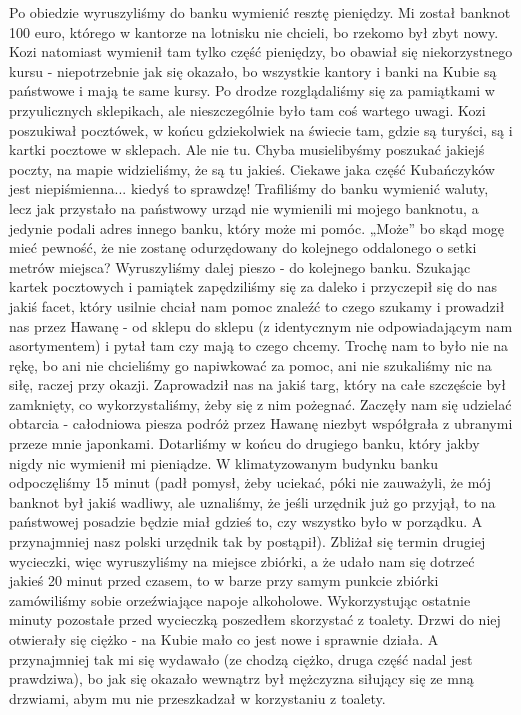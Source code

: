 Po obiedzie wyruszyliśmy do banku wymienić resztę pieniędzy. Mi został banknot 100 euro, którego w kantorze na lotnisku nie chcieli, bo rzekomo był zbyt nowy. Kozi natomiast wymienił tam tylko część pieniędzy, bo obawiał się niekorzystnego kursu - niepotrzebnie jak się okazało, bo wszystkie kantory i banki na Kubie są państwowe i mają te same kursy.
Po drodze rozglądaliśmy się za pamiątkami w przyulicznych sklepikach, ale nieszczególnie było tam coś wartego uwagi.
Kozi poszukiwał pocztówek, w końcu gdziekolwiek na świecie tam, gdzie są turyści, są i kartki pocztowe w sklepach.
Ale nie tu.
Chyba musielibyśmy poszukać jakiejś poczty, na mapie widzieliśmy, że są tu jakieś.
Ciekawe jaka część Kubańczyków jest niepiśmienna...
kiedyś to sprawdzę!
Trafiliśmy do banku wymienić waluty, lecz jak przystało na państwowy urząd nie wymienili mi mojego banknotu, a jedynie podali adres innego banku, który może mi pomóc.
„Może” bo skąd mogę mieć pewność, że nie zostanę odurzędowany do kolejnego oddalonego o setki metrów miejsca?
Wyruszyliśmy dalej pieszo - do kolejnego banku.
Szukając kartek pocztowych i pamiątek zapędziliśmy się za daleko i przyczepił się do nas jakiś facet, który usilnie chciał nam pomoc znaleźć to czego szukamy i prowadził nas przez Hawanę - od sklepu do sklepu (z identycznym nie odpowiadającym nam asortymentem) i pytał tam czy mają to czego chcemy.
Trochę nam to było nie na rękę, bo ani nie chcieliśmy go napiwkować za pomoc, ani nie szukaliśmy nic na siłę, raczej przy okazji.
Zaprowadził nas na jakiś targ, który na całe szczęście był zamknięty, co wykorzystaliśmy, żeby się z nim pożegnać.
Zaczęły nam się udzielać obtarcia - całodniowa piesza podróż przez Hawanę niezbyt współgrała z ubranymi przeze mnie japonkami.
Dotarliśmy w końcu do drugiego banku, który jakby nigdy nic wymienił mi pieniądze.
W klimatyzowanym budynku banku odpoczęliśmy 15 minut (padł pomysł, żeby uciekać, póki nie zauważyli, że mój banknot był jakiś wadliwy, ale uznaliśmy, że jeśli urzędnik już go przyjął, to na państwowej posadzie będzie miał gdzieś to, czy wszystko było w porządku.
A przynajmniej nasz polski urzędnik tak by postąpił).
Zbliżał się termin drugiej wycieczki, więc wyruszyliśmy na miejsce zbiórki, a że udało nam się dotrzeć jakieś 20 minut przed czasem, to w barze przy samym punkcie zbiórki zamówiliśmy sobie orzeźwiające napoje alkoholowe.
Wykorzystując ostatnie minuty pozostałe przed wycieczką poszedłem skorzystać z toalety.
Drzwi do niej otwierały się ciężko - na Kubie mało co jest nowe i sprawnie działa.
A przynajmniej tak mi się wydawało (ze chodzą ciężko, druga część nadal jest prawdziwa), bo jak się okazało wewnątrz był mężczyzna siłujący się ze mną drzwiami, abym mu nie przeszkadzał w korzystaniu z toalety.
